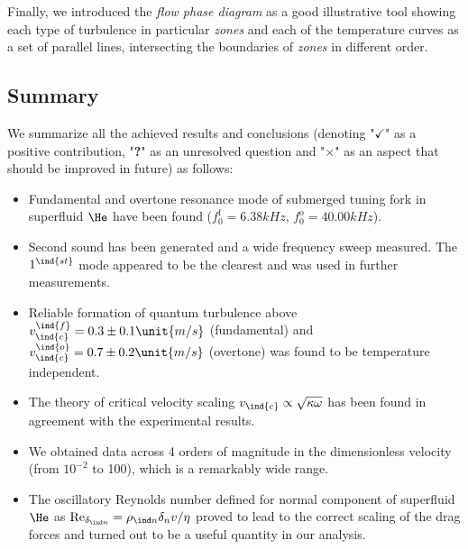 Finally, we introduced the \textit{flow phase diagram} as a good illustrative tool showing each type of turbulence in particular \textit{zones} and each of the temperature curves as a set of parallel lines, intersecting the boundaries of \textit{zones} in different order.

\subsection*{Summary}

We summarize all the achieved results and conclusions (denoting "$ \checkmark $" as a positive contribution, "\textbf{?}" as an unresolved question and "$ \times $" as an aspect that should be improved in future) as follows:


\begin{itemize}

	
	\item[\checkmark] Fundamental and overtone resonance mode of submerged tuning fork in superfluid $ \He $ have been found ($ f_0^{\text{f}} = 6.38\unit{kHz} $, $ f_0^{\text{o}} = 40.00\unit{kHz} $).
	
	\item[\checkmark] Second sound has been generated and a wide frequency sweep measured. The $ 1^{\ind{st}} $ mode appeared to be the clearest and was used in further measurements.
	
	\item[\checkmark] Reliable formation of quantum turbulence above $ v_{\ind{c}}^{\ind{{f}}} = 0.3 \pm 0.1 \unit{m/s}$ (fundamental) and $ v_{\ind{c}}^{\ind{{o}}} = 0.7 \pm 0.2 \unit{m/s}$ (overtone) was found to be temperature independent.
	
	\item[\checkmark] The theory of critical velocity scaling $ v_{\ind{c}} \propto \sqrt{\kappa\omega}$ has been found in agreement with the experimental results.
	
	\item[\checkmark] We obtained data across 4 orders of magnitude in the dimensionless velocity (from $ 10^{-2} $ to 100), which is a remarkably wide range.
	
	\item[\checkmark] The oscillatory Reynolds number defined for normal component of superfluid $ \He $ as $\text{Re}_{\delta_{\ind n}} = \rho_{\ind n}\delta_{n} v/\eta$ proved to lead to the correct scaling of the drag forces and turned out to be a useful quantity in our analysis.
	

\end{itemize}
